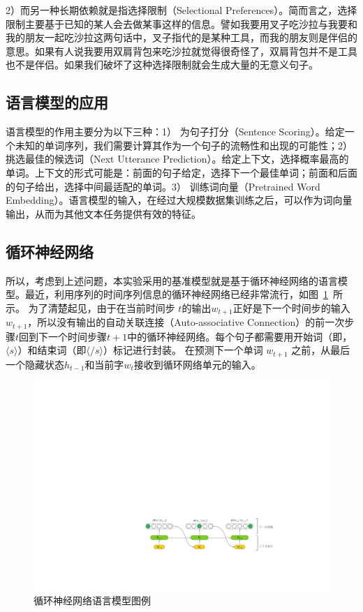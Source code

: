 2）而另一种长期依赖就是指选择限制（Selectional Preferences）。简而言之，选择限制主要基于已知的某人会去做某事这样的信息。譬如我要用叉子吃沙拉与我要和我的朋友一起吃沙拉这两句话中，叉子指代的是某种工具，而我的朋友则是伴侣的意思。如果有人说我要用双肩背包来吃沙拉就觉得很奇怪了，双肩背包并不是工具也不是伴侣。如果我们破坏了这种选择限制就会生成大量的无意义句子。

\subsection{语言模型的应用}
语言模型的作用主要分为以下三种：1） 为句子打分（Sentence Scoring）。给定一个未知的单词序列，我们需要计算其作为一个句子的流畅性和出现的可能性；2） 挑选最佳的候选词（Next Utterance Prediction）。给定上下文，选择概率最高的单词。上下文的形式可能是：前面的句子给定，选择下一个最佳单词；前面和后面的句子给出，选择中间最适配的单词。3） 训练词向量（Pretrained Word Embedding）。语言模型的输入，在经过大规模数据集训练之后，可以作为词向量输出，从而为其他文本任务提供有效的特征。
\subsection{循环神经网络}
所以，考虑到上述问题，本实验采用的基准模型就是基于循环神经网络的语言模型。最近，利用序列的时间序列信息的循环神经网络已经非常流行，如图~\ref{fig:lm}~所示。 为了清楚起见，由于在当前时间步 $ t $的输出$ w_ {t + 1} $正好是下一个时间步的输入$ w_ {t + 1} $，所以没有输出的自动关联连接（Auto-associative Connection）的前一次步骤$ t $回到下一个时间步骤$ t + 1 $中的循环神经网络。每个句子都需要用开始词（即，$ \langle s \rangle $）和结束词（即$ \langle / s \rangle $）标记进行封装。 在预测下一个单词 $ w_ {t + 1} $ 之前，从最后一个隐藏状态$ h_ {t-1} $和当前字$ w_t $接收到循环网络单元的输入。
\begin{figure}[!ht]
  \centering
  \includegraphics[width=1\columnwidth]{./figures/lm.pdf}
  \caption{循环神经网络语言模型图例}
  \label{fig:lm}
\end{figure}

